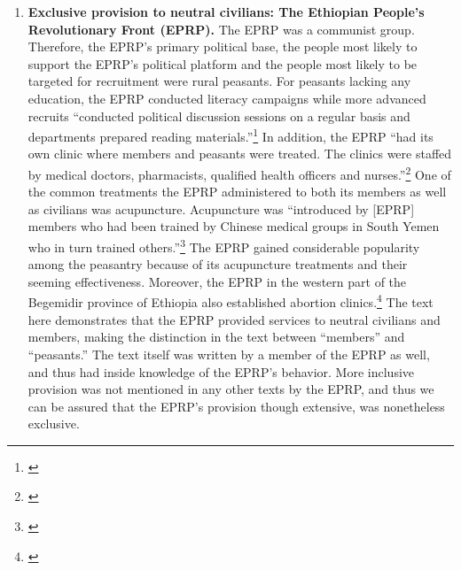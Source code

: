 \documentclass[12pt, letterpaper]{article}
\begin{document}
\begin{enumerate}
\item \textbf{Exclusive provision to neutral civilians: The Ethiopian People's Revolutionary Front (EPRP).} The EPRP was a communist group. Therefore, the EPRP's primary political base, the people most likely to support the EPRP's political platform and the people most likely to be targeted for recruitment were rural peasants. For peasants lacking any education, the EPRP conducted literacy campaigns while more advanced recruits ``conducted political discussion sessions on a regular basis and departments prepared reading materials.''\footnote{\citealt[366]{tadesse1998generation}} In addition, the EPRP ``had its own clinic where members and peasants were treated. The clinics were staffed by medical doctors, pharmacists, qualified health officers and nurses.''\footnote{\citealt[368]{tadesse1998generation}} One of the common treatments the EPRP administered to both its members as well as civilians was acupuncture. Acupuncture was ``introduced by [EPRP] members who had been trained by Chinese medical groups in South Yemen who in turn trained others.''\footnote{\citealt[368]{tadesse1998generation}} The EPRP gained considerable popularity among the peasantry because of its acupuncture treatments and their seeming effectiveness. Moreover, the EPRP in the western part of the Begemidir province of Ethiopia also established abortion clinics.\footnote{\citealt[369]{tadesse1998generation}} The text here demonstrates that the EPRP provided services to neutral civilians and members, making the distinction in the text between ``members'' and ``peasants.'' The text itself was written by a member of the EPRP as well, and thus had inside knowledge of the EPRP's behavior. More inclusive provision was not mentioned in any other texts by the EPRP, and thus we can be assured that the EPRP's provision though extensive, was nonetheless exclusive.

\end{enumerate}
\end{document}
